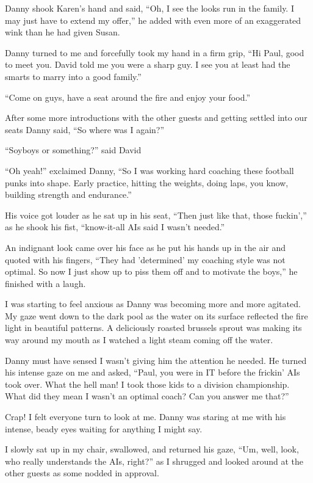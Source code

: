 Danny shook Karen's hand and said, ``Oh, I see the looks run in
the family. I may just have to extend my offer,''
he added with even more of an exaggerated wink than he had given
Susan.

Danny turned to me and forcefully took my hand in a firm grip,
``Hi Paul, good to meet you. David told me you were a sharp guy.
I see you at least had the smarts to marry into a good family.''

``Come on guys, have a seat around the fire and enjoy your
food.''

After some more introductions with the other guests and getting
settled into our seats Danny said, ``So where was I again?''

``Soyboys or something?'' said David

``Oh yeah!'' exclaimed Danny, ``So I was working hard coaching
these football punks into shape. Early practice, hitting the
weights, doing laps, you know, building strength and endurance.''

His voice got louder as he sat up in his seat, ``Then just like
that, those fuckin','' as he shook his fist, ``know-it-all AIs
said I wasn't needed.''

An indignant look came over his face as he put his hands up in
the air and quoted with his fingers,
``They had 'determined' my coaching style was not optimal. So
now I just show up to piss them off and to motivate the boys,''
he finished with a laugh.

I was starting to feel anxious as Danny was becoming more and
more agitated. My gaze went down to the dark pool as the water
on its surface reflected the fire light in beautiful patterns.
A deliciously roasted brussels sprout was making its way around
my mouth as I watched a light steam coming off the water.

Danny must have sensed I wasn't giving him the attention he
needed. He turned his intense gaze on me and asked,
``Paul, you were in IT before the frickin' AIs took over. What
the hell man! I took those kids to a division championship.
What did they mean I wasn't an optimal coach?  Can you answer me
that?''

Crap!  I felt everyone turn to look at me.  Danny was
staring at me with his intense, beady eyes waiting for anything
I might say.

I slowly sat up in my chair, swallowed, and returned his gaze, ``Um,
well, look, who really understands the AIs, right?'' as I
shrugged and looked around at the other guests as some nodded in
approval.

